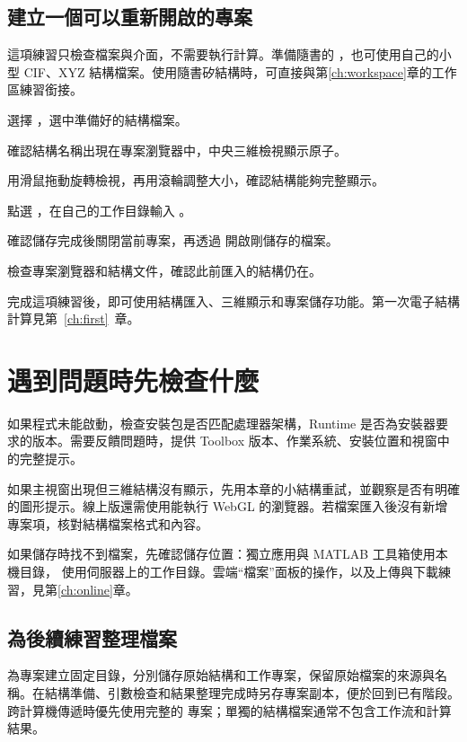 \subsection{建立一個可以重新開啟的專案}

這項練習只檢查檔案與介面，不需要執行計算。準備隨書的 ，也可使用自己的小型 CIF、XYZ 結構檔案。使用隨書矽結構時，可直接與第\ref{ch:workspace}章的工作區練習銜接。

\begin{steps}
\item 選擇 ，選中準備好的結構檔案。
\item 確認結構名稱出現在專案瀏覽器中，中央三維檢視顯示原子。
\item 用滑鼠拖動旋轉檢視，再用滾輪調整大小，確認結構能夠完整顯示。
\item 點選 ，在自己的工作目錄輸入 。
\item 確認儲存完成後關閉當前專案，再透過  開啟剛儲存的檔案。
\item 檢查專案瀏覽器和結構文件，確認此前匯入的結構仍在。
\end{steps}


完成這項練習後，即可使用結構匯入、三維顯示和專案儲存功能。第一次電子結構計算見第~\ref{ch:first}~章。

\section{遇到問題時先檢查什麼}

如果程式未能啟動，檢查安裝包是否匹配處理器架構，Runtime 是否為安裝器要求的版本。需要反饋問題時，提供 Toolbox 版本、作業系統、安裝位置和視窗中的完整提示。

如果主視窗出現但三維結構沒有顯示，先用本章的小結構重試，並觀察是否有明確的圖形提示。線上版還需使用能執行 WebGL 的瀏覽器。若檔案匯入後沒有新增專案項，核對結構檔案格式和內容。

如果儲存時找不到檔案，先確認儲存位置：獨立應用與 MATLAB\regmark{} 工具箱使用本機目錄，\ksonline{} 使用伺服器上的工作目錄。雲端“檔案”面板的操作，以及上傳與下載練習，見第\ref{ch:online}章。

\subsection{為後續練習整理檔案}

為專案建立固定目錄，分別儲存原始結構和工作專案，保留原始檔案的來源與名稱。在結構準備、引數檢查和結果整理完成時另存專案副本，便於回到已有階段。跨計算機傳遞時優先使用完整的  專案；單獨的結構檔案通常不包含工作流和計算結果。

